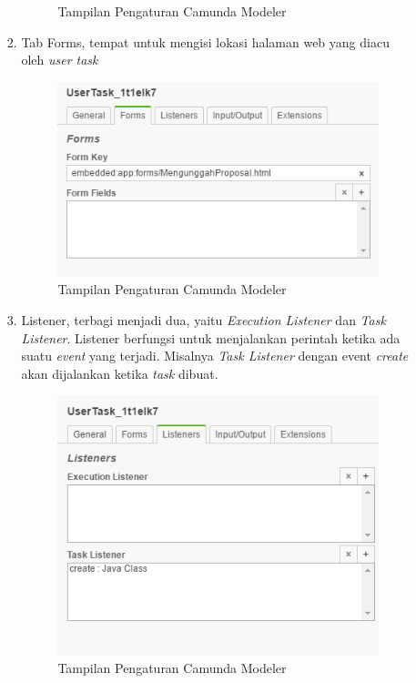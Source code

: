 \begin{itemize}
\begin{enumerate}
\begin{enumerate}
\begin{figure}[H]
				\caption{Tampilan Pengaturan Camunda Modeler} 
				\label{fig:camundaModelerPropertiesGeneral}
			\end{figure}
		\item Tab Forms, tempat untuk mengisi lokasi halaman web yang diacu oleh \textit{user task}
		\begin{figure}[H]
				\centering
				\includegraphics[scale=0.5]{Gambar/Bab-3/Modeler/4}
				\caption{Tampilan Pengaturan Camunda Modeler} 
				\label{fig:camundaModelerPropertiesForms}
		\end{figure}
		\item Listener, terbagi menjadi dua, yaitu \textit{Execution Listener} dan \textit{Task Listener}. Listener berfungsi untuk menjalankan perintah ketika ada suatu \textit{event} yang terjadi. Misalnya \textit{Task Listener} dengan event \textit{create} akan dijalankan ketika \textit{task} dibuat.
		\begin{figure}[H]
				\centering
				\includegraphics[scale=0.5]{Gambar/Bab-3/Modeler/5}
				\caption{Tampilan Pengaturan Camunda Modeler} 
				\label{fig:camundaModelerPropertiesListener}
		\end{figure}
	\end{enumerate}		





\end{enumerate}
\end{itemize}
